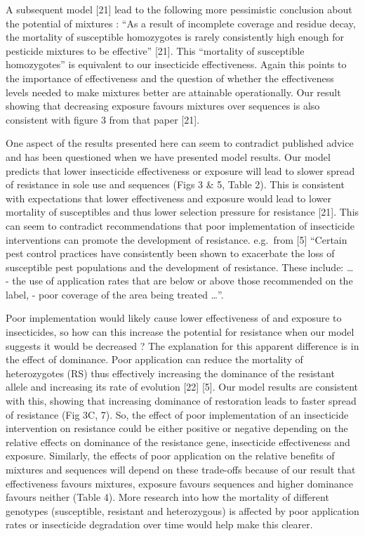 \documentclass[11pt,]{article}
\begin{document}
A subsequent model {[}21{]} lead to the following more pessimistic
conclusion about the potential of mixtures : ``As a result of incomplete
coverage and residue decay, the mortality of susceptible homozygotes is
rarely consistently high enough for pesticide mixtures to be effective''
{[}21{]}. This ``mortality of susceptible homozygotes'' is equivalent to
our insecticide effectiveness. Again this points to the importance of
effectiveness and the question of whether the effectiveness levels
needed to make mixtures better are attainable operationally. Our result
showing that decreasing exposure favours mixtures over sequences is also
consistent with figure 3 from that paper {[}21{]}.

One aspect of the results presented here can seem to contradict
published advice and has been questioned when we have presented model
results. Our model predicts that lower insecticide effectiveness or
exposure will lead to slower spread of resistance in sole use and
sequences (Figs 3 \& 5, Table 2). This is consistent with expectations
that lower effectiveness and exposure would lead to lower mortality of
susceptibles and thus lower selection pressure for resistance {[}21{]}.
This can seem to contradict recommendations that poor implementation of
insecticide interventions can promote the development of resistance.
e.g.~from {[}5{]} ``Certain pest control practices have consistently
been shown to exacerbate the loss of susceptible pest populations and
the development of resistance. These include: \ldots{} - the use of
application rates that are below or above those recommended on the
label, - poor coverage of the area being treated \ldots{}''.

Poor implementation would likely cause lower effectiveness of and
exposure to insecticides, so how can this increase the potential for
resistance when our model suggests it would be decreased ? The
explanation for this apparent difference is in the effect of dominance.
Poor application can reduce the mortality of heterozygotes (RS) thus
effectively increasing the dominance of the resistant allele and
increasing its rate of evolution {[}22{]} {[}5{]}. Our model results are
consistent with this, showing that increasing dominance of restoration
leads to faster spread of resistance (Fig 3C, 7). So, the effect of poor
implementation of an insecticide intervention on resistance could be
either positive or negative depending on the relative effects on
dominance of the resistance gene, insecticide effectiveness and
exposure. Similarly, the effects of poor application on the relative
benefits of mixtures and sequences will depend on these trade-offs
because of our result that effectiveness favours mixtures, exposure
favours sequences and higher dominance favours neither (Table 4). More
research into how the mortality of different genotypes (susceptible,
resistant and heterozygous) is affected by poor application rates or
insecticide degradation over time would help make this clearer.
\end{document}
